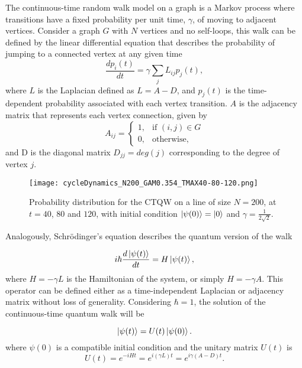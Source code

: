 \documentclass[main.tex]{subfiles}
\begin{document}
The continuous-time random walk model \cite{montrollweiss1965} on a graph is a
Markov process where transitions have a fixed probability per unit time,
$\gamma$, of moving to adjacent vertices. Consider a graph $G$ with $N$
vertices and no self-loops, this walk can be defined by the linear differential
equation that describes the probability of jumping to a connected vertex at any
given time 
\begin{equation}
	\frac{dp_i(t)}{dt} = \gamma \sum_j L_{ij} p_j(t), \label{eq:classicalContWalk}
\end{equation}
where $L$ is the Laplacian defined as $L = A - D$, and $p_j(t)$ is the
time-dependent probability associated with each vertex transition. $A$ is the
adjacency matrix that represents each vertex connection, given by
\begin{equation}
	A_{ij} = \begin{cases} 1, & \mbox{if } (i,j)\in G \\ 0, & \mbox{otherwise,} \end{cases}
\end{equation}
and D is the diagonal matrix $D_{jj} = deg(j)$ corresponding to the
degree
of vertex $j$.\par

\begin{figure}[!h]
	\centering
    \texttt{[image: cycleDynamics\_N200\_GAM0.354\_TMAX40-80-120.png]}
    \caption{Probability distribution for the CTQW on a line of size $N=200$,
    at $t=40$, $80$ and $120$, with initial condition $\ket{\psi(0)}=\ket{0}$
    and $\gamma=\frac{1}{2\sqrt{2}}$.} 
	\label{fig:contdist0}
\end{figure}

Analogously, Schrödinger's equation describes the quantum version of the walk 

\begin{equation}
	i\hbar \frac{d\ket{\psi(t)}}{dt} = H \ket{\psi(t)}, \label{shrodinger}
\end{equation}
where $H = -\gamma L$ is the Hamiltonian of the system, or simply $H = -\gamma
A$. This operator can be defined either as a time-independent Laplacian or
adjacency matrix without loss of generality. Considering $\hbar = 1$, the
solution of the continuous-time quantum walk will be 

\begin{equation}
	\ket{\psi(t)} = U(t)\ket{\psi(0)}.
    \label{eq:ctqwSystemEvolution}
\end{equation}
where $\psi(0)$ is a compatible initial condition and the unitary matrix $U(t)$
is
\begin{equation}
	U(t) = e^{-iHt} = e^{i(\gamma L)t} = e^{i\gamma(A-D)t}.
    \label{eq:contSimulUniOp}
\end{equation}
\end{document}
